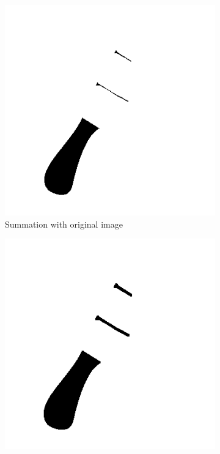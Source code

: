 \documentclass[a4paper]{article}
\begin{document}
\begin{figure}[htp]
\centering
\begin{subfigure}{.33\textwidth}
  \centering
  \includegraphics[width=.9\linewidth]{ex4.5-img-dilated}
  \caption{Summation with original image}
  \label{fig:sub1}
\end{subfigure}%
\begin{subfigure}{.33\textwidth}
  \centering
  \includegraphics[width=.9\linewidth]{ex4.6-eroted}

\end{subfigure}
\end{figure}
\end{document}

